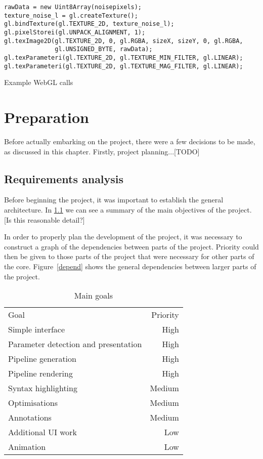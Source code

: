 \documentclass[12pt,twoside,notitlepage]{report}
\begin{document}
\begin{listing}[H]
\begin{verbatim}
rawData = new Uint8Array(noisepixels);
texture_noise_l = gl.createTexture();
gl.bindTexture(gl.TEXTURE_2D, texture_noise_l);
gl.pixelStorei(gl.UNPACK_ALIGNMENT, 1);
gl.texImage2D(gl.TEXTURE_2D, 0, gl.RGBA, sizeX, sizeY, 0, gl.RGBA, 
              gl.UNSIGNED_BYTE, rawData);
gl.texParameteri(gl.TEXTURE_2D, gl.TEXTURE_MIN_FILTER, gl.LINEAR);
gl.texParameteri(gl.TEXTURE_2D, gl.TEXTURE_MAG_FILTER, gl.LINEAR);
\end{verbatim}
\caption{Example WebGL calls}
\label{ugly}
\end{listing}

\cleardoublepage
\chapter{Preparation}
Before actually embarking on the project, there were a few decisions to be made, as discussed in this chapter. Firstly, project planning...[TODO]

\section{Requirements analysis}
Before beginning the project, it was important to establish the general architecture. In \ref{goals} we can see a summary of the main objectives of the project. [Is this reasonable detail?]

In order to properly plan the development of the project, it was necessary to construct a graph of the dependencies between parts of the project. Priority could then be given to those parts of the project that were necessary for other parts of the core. Figure~\ref{depend} shows the general dependencies between larger parts of the project. 
\begin{table}
\centering
\label{goals}
\begin{tabular}{l | r}
Goal & Priority \\
Simple interface & High \\
Parameter detection and presentation & High \\
Pipeline generation & High \\
Pipeline rendering & High \\
Syntax highlighting & Medium \\
Optimisations & Medium \\
Annotations & Medium \\
Additional UI work & Low \\
Animation & Low \\
\end{tabular}
\caption{Main goals}
\end{table}
\end{document}

